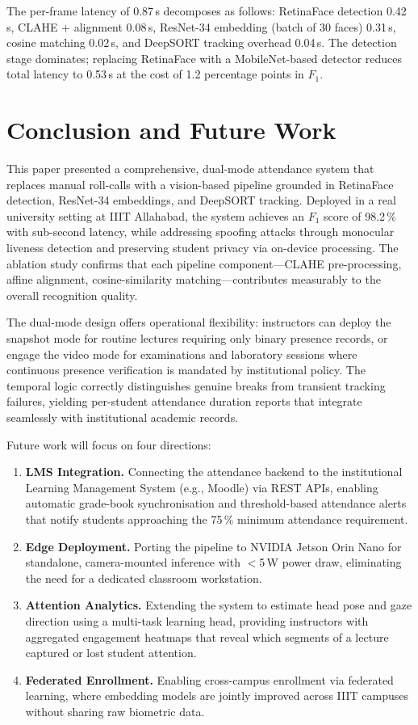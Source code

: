 \documentclass[conference, 10pt]{IEEEtran}
\begin{document}
The per-frame latency of 0.87\,s decomposes as follows: RetinaFace detection 0.42\,s,
CLAHE + alignment 0.08\,s, ResNet-34 embedding (batch of 30 faces) 0.31\,s, cosine matching
0.02\,s, and DeepSORT tracking overhead 0.04\,s.  The detection stage dominates; replacing
RetinaFace with a MobileNet-based detector reduces total latency to 0.53\,s at the cost of
1.2 percentage points in $F_1$.

\section{Conclusion and Future Work}
\label{sec:conclusion}

This paper presented a comprehensive, dual-mode attendance system that replaces manual
roll-calls with a vision-based pipeline grounded in RetinaFace detection, ResNet-34
embeddings, and DeepSORT tracking.  Deployed in a real university setting at IIIT Allahabad,
the system achieves an $F_1$ score of 98.2\,\% with sub-second latency, while addressing
spoofing attacks through monocular liveness detection and preserving student privacy via
on-device processing.  The ablation study confirms that each pipeline component---CLAHE
pre-processing, affine alignment, cosine-similarity matching---contributes measurably to the
overall recognition quality.

The dual-mode design offers operational flexibility: instructors can deploy the snapshot mode
for routine lectures requiring only binary presence records, or engage the video mode for
examinations and laboratory sessions where continuous presence verification is mandated by
institutional policy.  The temporal logic correctly distinguishes genuine breaks from transient
tracking failures, yielding per-student attendance duration reports that integrate seamlessly
with institutional academic records.

Future work will focus on four directions:
\begin{enumerate}
    \item \textbf{LMS Integration.}  Connecting the attendance backend to the institutional
          Learning Management System (e.g., Moodle) via REST APIs, enabling automatic grade-book
          synchronisation and threshold-based attendance alerts that notify students approaching
          the 75\,\% minimum attendance requirement.
    \item \textbf{Edge Deployment.}  Porting the pipeline to NVIDIA Jetson Orin Nano for
          standalone, camera-mounted inference with $<$5\,W power draw, eliminating the need
          for a dedicated classroom workstation.
    \item \textbf{Attention Analytics.}  Extending the system to estimate head pose and gaze
          direction using a multi-task learning head, providing instructors with aggregated
          engagement heatmaps that reveal which segments of a lecture captured or lost
          student attention.
    \item \textbf{Federated Enrollment.}  Enabling cross-campus enrollment via federated
          learning, where embedding models are jointly improved across IIIT campuses without
          sharing raw biometric data.
\end{enumerate}
\end{document}
